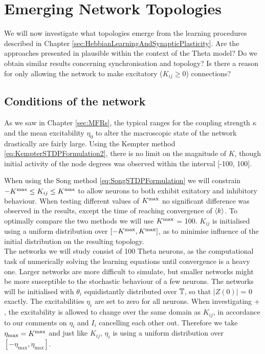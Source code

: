 \newpage
\section{\mywork Emerging Network Topologies} \label{sec:EmergingNetworkTopologies}

We will now investigate what topologies emerge from the learning procedures described in Chapter \ref{sec:HebbianLearningAndSynapticPlasticity}. Are the approaches presented in \cite{Kempter1999, Song2000, Song2017, ChrolCannon2012} plausible within the context of the Theta model? Do we obtain similar results concerning synchronisation and topology? Is there a reason for only allowing the network to make excitatory ($K_{ij} \geq 0$) connections? 

\subsection{Conditions of the network}
As we saw in Chapter \ref{sec:MFRs}, the typical ranges for the coupling strength $\kappa$ and the mean excitability $\eta_0$ to alter the macroscopic state of the network drastically are fairly large. Using the Kempter method \eqref{eq:KempterSTDPFormulation2}, there is no limit on the magnitude of $K$, though initial activity of the node degrees was observed within the interval [-100, 100]. 

When using the Song method \eqref{eq:SongSTDPFormulation} we will constrain $-K^{\rm max} \leq K_{ij} \leq K^{\rm max}$ to allow neurons to both exhibit exitatory and inhibitory behaviour. When testing different values of $K^{\rm max}$ no significant difference was observed in the results, except the time of reaching convergence of ${\langle k\rangle}$. To optimally compare the two methods we will use $K^{\rm max}$ = 100. $K_{ij}$ is initialised using a uniform distribution over $[-K^{\rm max}, K^{\rm max}]$, as to minimise influence of the initial distribution on the resulting topology.\\

The networks we will study consist of 100 Theta neurons, as the computational task of numerically solving the learning equations until convergence is a heavy one. Larger networks are more difficult to simulate, but smaller networks might be more susceptible to the stochastic behaviour of a few neurons. The networks will be initialised with $\theta_i$ equidistantly distributed over ${\mathbb{T}}$, so that $| Z(0) |$ = 0 exactly. The excitabilities $\eta_i$ are set to zero for all neurons. 
When investigating \STDP + \IP, the excitability is allowed to change over the same domain as $K_{ij}$, in accordance to our comments on $\eta_i$ and $I_i$ cancelling each other out. Therefore we take $\eta_{\max} = K^{\rm max}$ and just like $K_{ij}$, $\eta_i$ is using a uniform distribution over $[-\eta_{\max}, \eta_{\max}]$.



